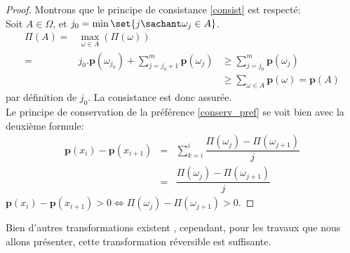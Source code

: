 {\begin{proof}
Montrons que le principe de consistance \ref{consist} est respecté: \\
Soit $A \in \Omega$, et $j_0 = \min \set{ j \sachant \omega_j \in A  }$. \\
\begin{eqnarray*}
\Pi(A)  = & \max_{\omega \in A}(\Pi(\omega)) & \\
= &  j_0. \mathbf{p}(\omega_{j_0}) + \displaystyle  \sum_{j=j_{0} +1}^m \mathbf{p}(\omega_j) & \geqslant  \sum_{j=j_0}^m \mathbf{p}(\omega_j) \\ 
 &  & \geqslant  \sum_{\omega \in A} \mathbf{p}(\omega) = \mathbf{p}(A)  
\end{eqnarray*}
par définition de $j_0$. La consistance est donc assurée. \\

Le principe de conservation de la préférence \ref{conserv_pref} se voit bien avec la deuxième formule: \\
\begin{eqnarray*}
\mathbf{p}(x_i) - \mathbf{p}(x_{i+1}) & = & \displaystyle \sum_{k=i}^{i} \dfrac{\Pi(\omega_j)-\Pi(\omega_{j+1})}{j} \\
& = & \displaystyle \dfrac{\Pi(\omega_j)-\Pi(\omega_{j+1})}{j} 
\end{eqnarray*}
$\mathbf{p}(x_i) - \mathbf{p}(x_{i+1})>0 \Leftrightarrow \Pi(\omega_j)-\Pi(\omega_{j+1})>0$.
\end{proof}
Bien d'autres transformations existent \cite{1993.1}, cependant, pour les travaux que nous allons présenter, cette transformation réversible est suffisante.
}

